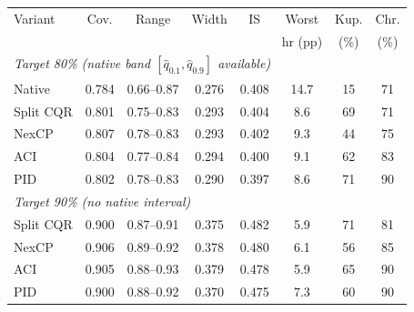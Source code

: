 \begin{tabular}{lccccccc}
\toprule
Variant & Cov. & Range & Width & IS & Worst & Kup. & Chr. \\
 & & & & & hr (pp) & (\%) & (\%) \\
\midrule
\multicolumn{8}{l}{\emph{Target 80\% (native band $[\hat q_{0.1},\hat q_{0.9}]$ available)}} \\
Native & 0.784 & 0.66--0.87 & 0.276 & 0.408 & 14.7 & 15 & 71 \\
Split CQR & 0.801 & 0.75--0.83 & 0.293 & 0.404 & 8.6 & 69 & 71 \\
NexCP & 0.807 & 0.78--0.83 & 0.293 & 0.402 & 9.3 & 44 & 75 \\
ACI & 0.804 & 0.77--0.84 & 0.294 & 0.400 & 9.1 & 62 & 83 \\
PID & 0.802 & 0.78--0.83 & 0.290 & 0.397 & 8.6 & 71 & 90 \\
\midrule
\multicolumn{8}{l}{\emph{Target 90\% (no native interval)}} \\
Split CQR & 0.900 & 0.87--0.91 & 0.375 & 0.482 & 5.9 & 71 & 81 \\
NexCP & 0.906 & 0.89--0.92 & 0.378 & 0.480 & 6.1 & 56 & 85 \\
ACI & 0.905 & 0.88--0.93 & 0.379 & 0.478 & 5.9 & 65 & 90 \\
PID & 0.900 & 0.88--0.92 & 0.370 & 0.475 & 7.3 & 60 & 90 \\
\bottomrule
\end{tabular}
